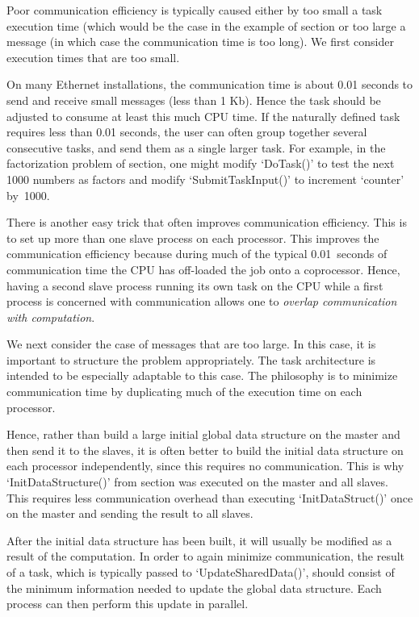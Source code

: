 {\it

Poor communication efficiency is typically caused either by too small a task
execution time (which would be the case in the example of
section or too large a message (in which case the
communication time is too long).  We first consider execution times that are
too small.

On many Ethernet installations, the communication time is about 0.01
seconds to send and receive small messages (less than 1 Kb).  Hence the
task should be adjusted to consume at least this much CPU time.  If the
naturally defined task requires less than 0.01 seconds, the user can often
group together several consecutive tasks, and send them as a single larger
task.  For example, in the factorization problem of section, one
might modify `DoTask()' to test the next 1000 numbers as factors and
modify `SubmitTaskInput()' to increment `counter' by~1000.

There is another easy trick that often improves communication efficiency.
This is to set up more than one slave process on each processor.  This
improves the communication efficiency because during much of the typical
0.01~seconds of communication time the CPU has off-loaded the job onto a
coprocessor.  Hence, having a second slave process running its own task on the
CPU while a first process is concerned with communication allows one to
{\it overlap communication with computation}.

We next consider the case of messages that are too large.  In this case, it
is important to structure the problem appropriately.  The task architecture
is intended to be especially adaptable to this case.  The philosophy is to
minimize communication time by duplicating much of the execution time on
each processor.

Hence, rather than build a large initial global data structure
on the master and then send it to the slaves, it is often better to build the
initial data structure on each processor independently, since this requires
no communication.  This is why `InitDataStructure()' from
section was executed on the master and all slaves.  This requires
less communication overhead than executing `InitDataStruct()' once on the
master and sending the result to all slaves.

After the initial data structure has been built, it will usually be
modified as a result of the computation.  In order to again minimize
communication, the result of a task, which is typically passed to
`UpdateSharedData()', should consist of the minimum information
needed to update the global data structure.  Each process can then
perform this update in parallel.

}

